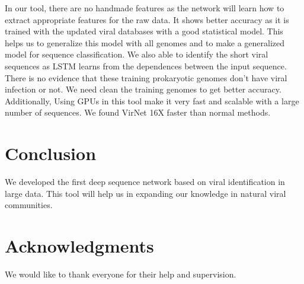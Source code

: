 \documentclass[conference]{IEEEtran}
\begin{document}
In our tool, there are no handmade features as the network will learn how to extract appropriate features for the raw data. It shows better accuracy as it is trained with the updated viral databases with a good statistical model. This helps us to generalize this model with all genomes and to make a generalized model for sequence classification. We also able to identify the short viral sequences as LSTM learns from the dependences between the input sequence. 
There is no evidence that these training prokaryotic genomes don't have viral infection or not. We need clean the training genomes to get better accuracy. Additionally, Using GPUs in this tool make it very fast and scalable with a large number of sequences. We found VirNet 16X faster than normal methods. 

\section{Conclusion}

We developed the first deep sequence network based on viral identification in large data. This tool will help us in expanding our knowledge in natural viral communities.

\section*{Acknowledgments}

We would like to thank everyone for their help and supervision.




\end{document}
